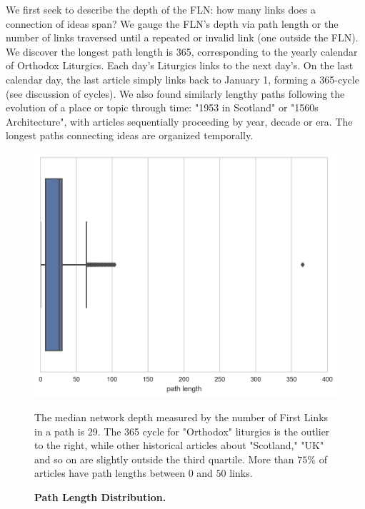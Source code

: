 \documentclass[pre,twocolumn,twoside,superscriptaddress,floatfix, aps, 10pt]{revtex4-1}
\begin{document}
We first seek to describe the depth of the FLN: how many links does a 
connection of ideas span? We gauge the FLN's depth via path length or the number of links traversed until a repeated or invalid link (one outside the FLN). 
We discover the longest path length is 365,
corresponding to the yearly calendar of Orthodox Liturgics.
Each day's Liturgics links to the next day's. On the last calendar day, the last article simply links back to January 1, forming a 365-cycle 
(see discussion of cycles).
We also found similarly lengthy paths following the evolution of a place or topic through time: 
"1953 in Scotland" or "1560s Architecture", with articles sequentially proceeding by year, decade or era.
The longest paths connecting ideas are organized temporally.

\begin{figure}[tp!]
  \centering	
  \includegraphics[width=\columnwidth]{graphics/path_lengths_boxplot.png}
  \caption{
    \textbf{Path Length Distribution.}
  }
  The median network depth measured by the number of First Links in a path
  is 29. The 365 cycle for "Orthodox" liturgics is the outlier to the right, while
  other historical articles about "Scotland," "UK" and so on are slightly outside
  the third quartile. More than $75\%$ of articles have path lengths between 
  $0$ and $50$ links.

  \label{fig:Path Length Distribution}
\end{figure}
\end{document}
